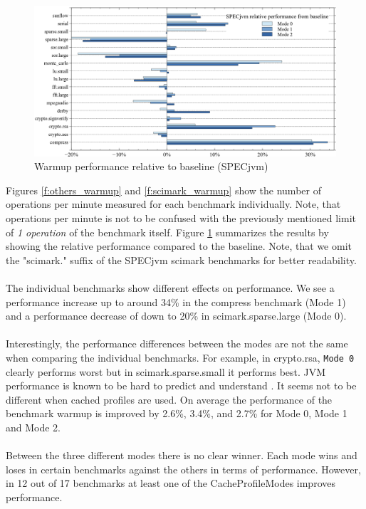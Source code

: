 \begin{figure}[ht!]
  \begin{center}
    \centering
    \includegraphics[width=1.0\textwidth]{figures/all_warmup_variation.png}
    \caption{Warmup performance relative to baseline (SPECjvm)}
    \label{f:all_warmup_variation}
  \end{center}
\end{figure}
Figures \ref{f:others_warmup} and \ref{f:scimark_warmup} show the number of operations per minute measured for each benchmark individually. Note, that operations per minute is not to be confused with the previously mentioned limit of \textit{1 operation} of the benchmark itself.
Figure \ref{f:all_warmup_variation} summarizes the results by showing the relative performance compared to the baseline.
Note, that we omit the "scimark." suffix of the SPECjvm scimark benchmarks for better readability.
\\\\
The individual benchmarks show different effects on performance. We see a performance increase up to around 34\% in the compress benchmark (Mode 1) and a performance decrease of down to 20\% in scimark.sparse.large (Mode 0).
\\\\
Interestingly, the performance differences between the modes are not the same when comparing the individual benchmarks. For example, in crypto.rsa, \texttt{Mode 0} clearly performs worst but in scimark.sparse.small it performs best.
JVM performance is known to be hard to predict and understand \cite{georges2007statistically}. It seems not to be different when cached profiles are used. On average the performance of the benchmark warmup is improved by 2.6\%, 3.4\%, and 2.7\% for Mode 0, Mode 1 and Mode 2.
\\\\
Between the three different modes there is no clear winner. Each mode wins and loses in certain benchmarks against the others in terms of performance. However, in 12 out of 17 benchmarks at least one of the CacheProfileModes improves performance. 
